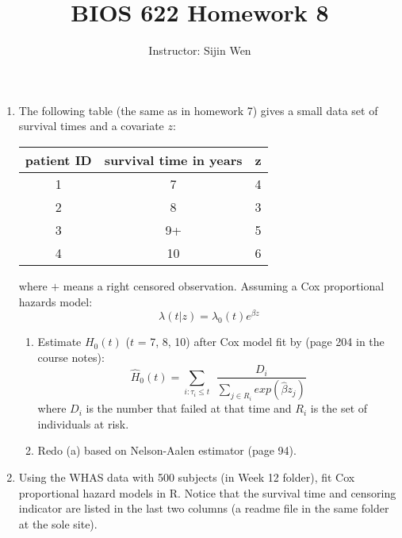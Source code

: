 \documentclass[11pt]{article}
\begin{document}
%
\def\bebf{\mbox{\boldmath $\beta$}}
\def\mubf{\mbox{\boldmath $\mu$}}
\def\epbf{\mbox{\scriptsize\boldmath $\epsilon$}}
\def\mus{\mbox{\scriptsize\boldmath $\mu$}}


\title{BIOS 622 Homework 8 }
\author{Instructor: Sijin Wen}
\maketitle

\baselineskip=13pt


\begin{enumerate}

\item The following table (the same as in homework 7) gives a small data set of survival times and a covariate $z$:

\begin{center}

\begin{tabular}{|c|c|c|}
 \hline
\hline
patient ID & survival time in years & z
\\
\hline
1	& 7 & 4\\
\hline
2	&8 & 3\\
\hline
3	&9+ & 5\\
\hline
4	&10 & 6\\
\hline
\hline

\end{tabular}
\end{center}

where $+$ means a right censored observation. Assuming a Cox proportional hazards model:
$$
\lambda(t|z) = \lambda_0(t) e^{\beta z}
$$
\begin{enumerate}
\item Estimate $H_0(t)$ ($t$ = 7, 8, 10) after Cox model fit by (page 204 in the course notes):
$$
\hat{H}_0(t) = \sum_{i: \tau_i \le t} ~~ \frac{D_i}{\sum_{j \in R_i } exp(\hat{\beta}z_j)}
$$
where $D_i$ is the number that failed at that time and $R_i$ is the set of individuals at risk.

\item Redo (a) based on Nelson-Aalen estimator (page 94).

\end{enumerate}

\item Using the WHAS data with 500 subjects (in Week 12 folder), fit Cox proportional hazard models in R. Notice that the survival time and censoring indicator are listed in the last two columns (a readme file in the same folder at the sole site). 
\begin{enumerate}


\end{enumerate}
\end{enumerate}
\end{document}
